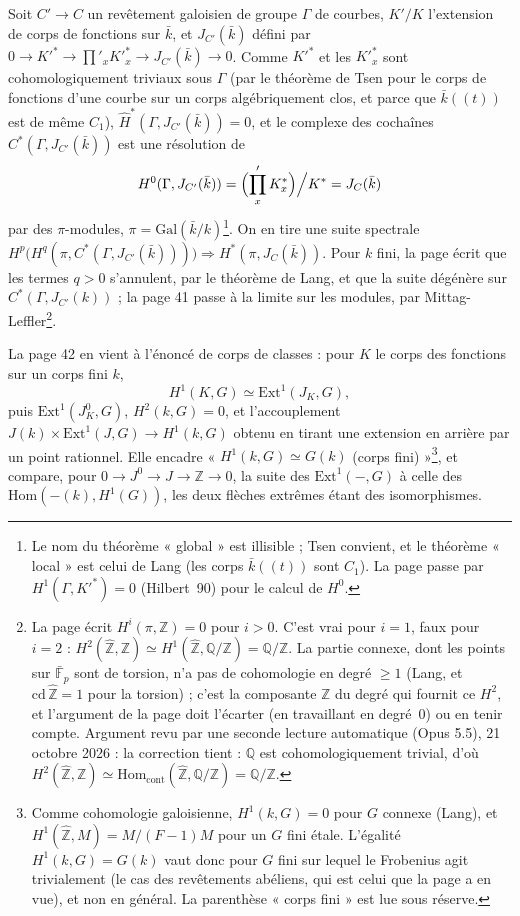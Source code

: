 \documentclass[11pt,a4paper]{article}
\begin{document}
Soit $C' \to C$ un revêtement galoisien de groupe $\Gamma$ de courbes, $K'/K$
l'extension de corps de fonctions sur $\bar k$, et $J_{C'}(\bar k)$ défini par
$0 \to K'^{*} \to \prod'_x K'^{*}_x \to J_{C'}(\bar k) \to 0$. Comme $K'^{*}$ et
les $K'^{*}_x$ sont cohomologiquement triviaux sous $\Gamma$ (par le théorème de
Tsen pour le corps de fonctions d'une courbe sur un corps algébriquement clos, et
parce que $\bar k((t))$ est de même $C_1$), $\hat H^{*}(\Gamma, J_{C'}(\bar k)) = 0$,
et le complexe des cochaînes $C^{*}(\Gamma, J_{C'}(\bar k))$ est une résolution de
\[
H^0(\Gamma, J_{C'}(\bar k)) = \Bigl(\prod'_{x} K^{*}_x\Bigr)\Big/ K^{*} = J_C(\bar k)
\]
par des $\pi$-modules, $\pi = \mathrm{Gal}(\bar k/k)$\footnote{Le nom du théorème
« global » est illisible ; Tsen convient, et le théorème « local » est celui de
Lang (les corps $\bar k((t))$ sont $C_1$). La page passe par $H^1(\Gamma, K'^{*}) =
0$ (Hilbert~90) pour le calcul de $H^0$.}. On en tire une suite spectrale
$H^p\bigl(H^q(\pi, C^{*}(\Gamma, J_{C'}(\bar k)))\bigr) \Rightarrow H^{*}(\pi,
J_C(\bar k))$. Pour $k$ fini, la page écrit que les termes $q > 0$ s'annulent,
par le théorème de Lang, et que la suite dégénère sur $C^{*}(\Gamma, J_{C'}(k))$ ;
la page 41 passe à la limite sur les modules, par Mittag-Leffler\footnote{La page
écrit $H^{i}(\pi, \mathbb{Z}) = 0$ pour $i > 0$. C'est vrai pour $i = 1$, faux pour
$i = 2$ : $H^2(\hat{\mathbb{Z}}, \mathbb{Z}) \simeq H^1(\hat{\mathbb{Z}},
\mathbb{Q}/\mathbb{Z}) = \mathbb{Q}/\mathbb{Z}$. La partie connexe, dont les points
sur $\bar{\mathbb{F}}_p$ sont de torsion, n'a pas de cohomologie en degré
$\geq 1$ (Lang, et $\mathrm{cd}\,\hat{\mathbb{Z}} = 1$ pour la torsion) ; c'est la
composante $\mathbb{Z}$ du degré qui fournit ce $H^2$, et l'argument de la page
doit l'écarter (en travaillant en degré~$0$) ou en tenir compte. Argument revu par une seconde lecture automatique (Opus 5.5), 21 octobre 2026 : la correction tient : $\mathbb{Q}$ est cohomologiquement trivial, d'où $H^{2}(\hat{\mathbb{Z}}, \mathbb{Z}) \simeq \mathrm{Hom}_{\mathrm{cont}}(\hat{\mathbb{Z}}, \mathbb{Q}/\mathbb{Z}) = \mathbb{Q}/\mathbb{Z}$.}.

La page 42 en vient à l'énoncé de corps de classes : pour $K$ le corps des
fonctions sur un corps fini $k$,
\[
H^1(K, G) \simeq \mathrm{Ext}^1(J_K, G),
\]
puis $\mathrm{Ext}^1(J^0_K, G)$, $H^2(k, G) = 0$, et l'accouplement
$J(k) \times \mathrm{Ext}^1(J, G) \to H^1(k, G)$ obtenu en tirant une extension en
arrière par un point rationnel. Elle encadre « $H^1(k, G) \simeq G(k)$ (corps
fini) »\footnote{Comme cohomologie galoisienne, $H^1(k, G) = 0$ pour $G$ connexe
(Lang), et $H^1(\hat{\mathbb{Z}}, M) = M/(F - 1)M$ pour un $G$ fini étale. L'égalité
$H^1(k, G) = G(k)$ vaut donc pour $G$ fini sur lequel le Frobenius agit
trivialement (le cas des revêtements abéliens, qui est celui que la page a en
vue), et non en général. La parenthèse « corps fini » est lue sous réserve.},
et compare, pour $0 \to J^0 \to J \to \mathbb{Z} \to 0$, la suite des
$\mathrm{Ext}^1(-, G)$ à celle des $\mathrm{Hom}(-(k), H^1(G))$, les deux
flèches extrêmes étant des isomorphismes.
\end{document}
